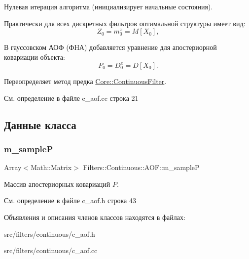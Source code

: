 Нулевая итерация алгоритма (инициализирует начальные состояния). 

Практически для всех дискретных фильтров оптимальной структуры имеет вид\+: \[Z_0 = m_0^x = M[X_0],\]

В гауссовском АОФ (ФНА) добавляется уравнение для апостериорной ковариации объекта\+: \[P_0 = D_0^x = D[X_0].\] 

Переопределяет метод предка \hyperlink{class_core_1_1_continuous_filter_a4c30983f9354344717538f807855f2ae}{Core\+::\+Continuous\+Filter}.



См. определение в файле c\+\_\+aof.\+cc строка 21



\subsection{Данные класса}
\hypertarget{class_filters_1_1_continuous_1_1_a_o_f_a3cff90f7e12e677f04102f1717ef7a49}{}\label{class_filters_1_1_continuous_1_1_a_o_f_a3cff90f7e12e677f04102f1717ef7a49} 
\subsubsection{\texorpdfstring{m\+\_\+sampleP}{m\_sampleP}}
{\footnotesize\ttfamily Array$<$Math\+::\+Matrix$>$ Filters\+::\+Continuous\+::\+A\+O\+F\+::m\+\_\+sampleP\hspace{0.3cm}{\ttfamily [protected]}}

Массив апостериорных ковариаций $P$. 

См. определение в файле c\+\_\+aof.\+h строка 43



Объявления и описания членов классов находятся в файлах\+:\begin{DoxyCompactItemize}
\item 
src/filters/continuous/c\+\_\+aof.\+h\item 
src/filters/continuous/c\+\_\+aof.\+cc\end{DoxyCompactItemize}
